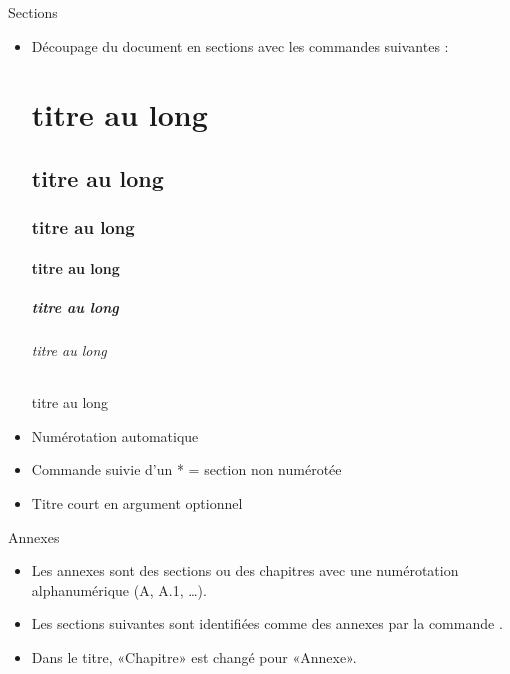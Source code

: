 \begin{frame}[fragile]{Sections}
	\begin{itemize}
		\item Découpage du document en sections avec les commandes suivantes :
\begin{codesource}
	\part[titre court]{titre au long}
	\chapter[titre court]{titre au long}
	\section[titre court]{titre au long}
	\subsection[titre court]{titre au long}
	
	\subsubsection[titre court]{titre au long} 	%
	
	\paragraph[titre court]{titre au long} 		%
	\subparagraph[titre court]{titre au long} 	%
\end{codesource}

		\item Numérotation automatique
		\item Commande suivie d'un * = section non numérotée
		\item Titre court en argument optionnel
	\end{itemize}
\end{frame}

\begin{frame}[fragile,c]{Annexes}
	\begin{itemize}
		\item Les annexes sont des sections ou des chapitres avec une numérotation alphanumérique (A,
		A.1, \ldots).
		\item Les sections suivantes sont identifiées comme des annexes par la commande 
			.
		\item Dans le titre, «Chapitre» est changé pour «Annexe».
	\end{itemize}
\end{frame}

